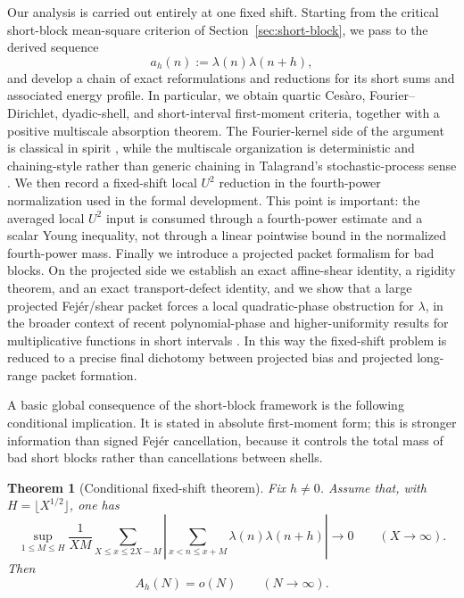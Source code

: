 \documentclass[11pt]{scrartcl}
\numberwithin{equation}{section}
\newtheorem{theorem}{Theorem}[section]
\theoremstyle{definition}
\newcommand{\1}{\mathbf 1}
\newcommand{\abs}[1]{\left|#1\right|}
\begin{document}
Our analysis is carried out entirely at one fixed shift. Starting from the critical short-block mean-square criterion of Section~\ref{sec:short-block}, we pass to the derived sequence
\[
a_h(n):=\lambda(n)\lambda(n+h),
\]
and develop a chain of exact reformulations and reductions for its short sums and associated energy profile. In particular, we obtain quartic Ces\`aro, Fourier--Dirichlet, dyadic-shell, and short-interval first-moment criteria, together with a positive multiscale absorption theorem. The Fourier-kernel side of the argument is classical in spirit \cite{zygmund1959trigonometric,grafakos2008classical}, while the multiscale organization is deterministic and chaining-style rather than generic chaining in Talagrand's stochastic-process sense \cite{talagrand2005generic}. We then record a fixed-shift local $U^2$ reduction in the fourth-power normalization used in the formal development. This point is important: the averaged local $U^2$ input is consumed through a fourth-power estimate and a scalar Young inequality, not through a linear pointwise bound in the normalized fourth-power mass. Finally we introduce a projected packet formalism for bad blocks. On the projected side we establish an exact affine-shear identity, a rigidity theorem, and an exact transport-defect identity, and we show that a large projected Fej\'er/shear packet forces a local quadratic-phase obstruction for $\lambda$, in the broader context of recent polynomial-phase and higher-uniformity results for multiplicative functions in short intervals \cite{matomaki2023higher,greentao2012mobiusnil,matomakiShao2021poly}. In this way the fixed-shift problem is reduced to a precise final dichotomy between projected bias and projected long-range packet formation.

A basic global consequence of the short-block framework is the following conditional implication. It is stated in absolute first-moment form; this is stronger information than signed Fej\'er cancellation, because it controls the total mass of bad short blocks rather than cancellations between shells.

\begin{theorem}[Conditional fixed-shift theorem]\label{thm:main}
Fix $h\neq 0$. Assume that, with $H=\lfloor X^{1/2}\rfloor$, one has
\begin{equation}\label{eq:main-first-moment-hyp}
\sup_{1\le M\le H}
\frac{1}{XM}
\sum_{X\le x\le 2X-M}
\abs{\sum_{x<n\le x+M}\lambda(n)\lambda(n+h)}
\to 0
\qquad (X\to\infty).
\end{equation}
Then
\[
A_h(N)=o(N)
\qquad (N\to\infty).
\]
\end{theorem}
\end{document}
